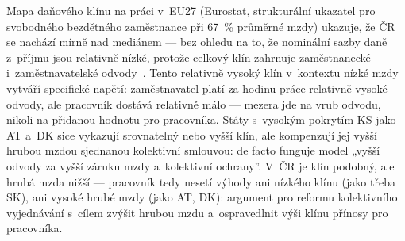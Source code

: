 Mapa daňového klínu na práci v~\ac{EU}27 (Eurostat, strukturální ukazatel pro svobodného bezdětného zaměstnance při \SI{67}{\percent} průměrné mzdy) ukazuje, že ČR se nachází mírně nad mediánem --- bez ohledu na to, že nominální sazby daně z~příjmu jsou relativně nízké, protože celkový klín zahrnuje zaměstnanecké i~zaměstnavatelské odvody~\cite{eurostat_earn_nt_taxwedge_PC_AW100}.
Tento relativně vysoký klín v~kontextu nízké mzdy vytváří specifické napětí: zaměstnavatel platí za hodinu práce relativně vysoké odvody, ale pracovník dostává relativně málo --- mezera jde na vrub odvodu, nikoli na přidanou hodnotu pro pracovníka.
Státy s~vysokým pokrytím \ac{KS} jako AT a~DK sice vykazují srovnatelný nebo vyšší klín, ale kompenzují jej vyšší hrubou mzdou sjednanou kolektivní smlouvou: de facto funguje model „vyšší odvody za vyšší záruku mzdy a~kolektivní ochrany”.
V~ČR je klín podobný, ale hrubá mzda nižší --- pracovník tedy nesetí výhody ani nízkého klínu (jako třeba SK), ani vysoké hrubé mzdy (jako AT, DK): argument pro reformu kolektivního vyjednávání s~cílem zvýšit hrubou mzdu a~ospravedlnit výši klínu přínosy pro pracovníka.


